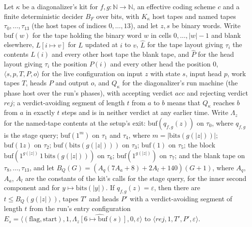 \begin{theorem}
\label{Turing.NTimeDiag.dz_qoff}
\leanok
{}
Let $\kappa$ be a diagonalizer's kit for $f, g : \mathbb{N} \to \mathbb{N}$, an effective coding scheme $c$ and a finite deterministic decider $B_F$ over bits, with $K_\kappa$ host tapes and named tapes $\tau_0, \dots, \tau_{13}$ (the host tapes of indices $0, \dots, 13$), and let $z, s$ be binary words. Write $\mathrm{buf}(w)$ for the tape holding the binary word $w$ in cells $0, \dots, |w| - 1$ and blank elsewhere, $L[i \mapsto v]$ for $L$ updated at $i$ to $v$, $\hat L$ for the tape layout giving $\tau_i$ the contents $L(i)$ and every other host tape the blank tape, and $\hat P$ for the head layout giving $\tau_i$ the position $P(i)$ and every other head the position $0$, $\langle s, p, T, P, o\rangle$ for the live configuration on input $z$ with state $s$, input head $p$, work tapes $T$, heads $P$ and output $o$, and $Q_\kappa$ for the diagonalizer's run machine (the phase host over the run's phases), with accepting verdict $\mathit{acc}$ and rejecting verdict $\mathit{rej}$; a verdict-avoiding segment of length $t$ from $a$ to $b$ means that $Q_\kappa$ reaches $b$ from $a$ in exactly $t$ steps and is in neither verdict at any earlier time. Write $\Lambda_z$ for the named-tape contents at the setup's exit: $\mathrm{buf}(q_{f,g}(z))$ on $\tau_0$, where $q_{f,g}$ is the stage query; $\mathrm{buf}(1^m)$ on $\tau_1$ and $\tau_4$, where $m = |\mathrm{bits}(g(|z|))|$; $\mathrm{buf}(1z)$ on $\tau_2$; $\mathrm{buf}(\mathrm{bits}(g(|z|)))$ on $\tau_3$; $\mathrm{buf}(1)$ on $\tau_5$; the block $\mathrm{buf}(1^{g(|z|)}\,1\,\mathrm{bits}(g(|z|)))$ on $\tau_6$; $\mathrm{buf}(1^{g(|z|)})$ on $\tau_7$; and the blank tape on $\tau_8, \dots, \tau_{13}$, and let $B_Q(G) = (A_q(7A_a + 8) + 2A_l + 140)(G + 1)$, where $A_q$, $A_a$, $A_l$ are the constants of the kit's calls for the stage query, for the inner second component and for $y \mapsto \mathrm{bits}(|y|)$. If $q_{f,g}(z) = \varepsilon$, then there are $t \le B_Q(g(|z|))$, tapes $T'$ and heads $P'$ with a verdict-avoiding segment of length $t$ from the run's entry configuration $E_s = \langle (\text{flag}, \text{start}), 1, \widehat{\Lambda_z[6 \mapsto \mathrm{buf}(s)]}, 0, \varepsilon\rangle$ to $\langle \mathit{rej}, 1, T', P', \varepsilon\rangle$.
\end{theorem}

